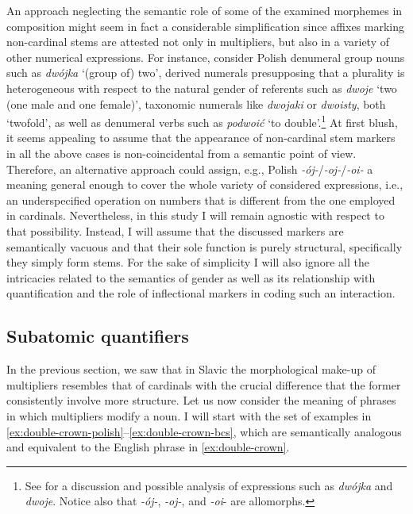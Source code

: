 An approach neglecting the semantic role of some of the examined morphemes in composition might seem in fact a considerable simplification since affixes marking non-cardinal stems are attested not only in multipliers, but also in a variety of other numerical expressions. For instance, consider Polish denumeral group nouns such as \textit{dwójka} `(group of) two', derived numerals presupposing that a plurality is heterogeneous with respect to the natural gender of referents such as \textit{dwoje} `two (one male and one female)', taxonomic numerals like \textit{dwojaki} or \textit{dwoisty}, both `twofold', as well as denumeral verbs such as \textit{podwoić} `to double'.\footnote{See \citet{wagiel2014boys,wagiel2015sums} for a discussion and possible analysis of expressions such as \textit{dwójka} and \textit{dwoje}. Notice also that \textit{-ój-}, \textit{-oj-}, and \textit{-oi}- are allomorphs.} At first blush, it seems appealing to assume that the appearance of non-cardinal stem markers in all the above cases is non-coincidental from a semantic point of view. Therefore, an alternative approach could assign, e.g., Polish \textit{-ój-}/\textit{-oj-}/\textit{-oi-} a meaning general enough to cover the whole variety of considered expressions, i.e., an underspecified operation on numbers that is different from the one employed in cardinals. Nevertheless, in this study I will remain agnostic with respect to that possibility. Instead, I will assume that the discussed markers are semantically vacuous and that their sole function is purely structural, specifically they simply form stems. For the sake of simplicity I will also ignore all the intricacies related to the semantics of gender as well as its relationship with quantification \citep[see, e.g.,][]{arsenijevic2017gender,fassi_fehri2016semantic,fassi_fehri2018constructing,wagiel-toappear-grammatical} and the role of inflectional markers in coding such an interaction.

\subsection{Subatomic quantifiers}\label{sec:subatomic-quantifiers}

In the previous section, we saw that in Slavic the morphological make-up of multipliers resembles that of cardinals with the crucial difference that the former consistently involve more structure. Let us now consider the meaning of phrases in which multipliers modify a noun. I will start with the set of examples in \ref{ex:double-crown-polish}--\ref{ex:double-crown-bcs}, which are semantically analogous and equivalent to the English phrase in \ref{ex:double-crown}. 

